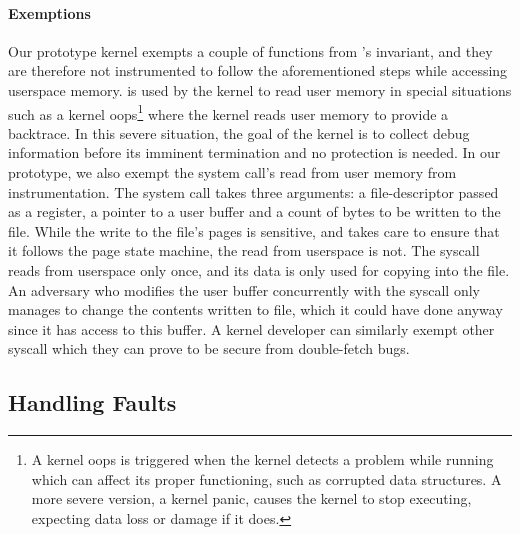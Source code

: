 \documentclass[letterpaper,twocolumn,10pt, anonymous]{article}
\begin{document}
\paragraph{Exemptions}
Our prototype \tiktok kernel exempts a couple of functions 
from \tiktok's invariant, and they are therefore not instrumented 
to follow the aforementioned steps while accessing userspace
memory. 
 is used by the kernel to 
read user memory in special situations such as a kernel 
oops\footnote{A kernel oops is triggered when the kernel detects a 
problem while running which can affect its proper functioning, such 
as corrupted data structures. 
A more severe version, a kernel panic, causes the kernel to stop 
executing, expecting data loss or damage if it does.}
where the kernel reads user memory to provide a backtrace. 
In this severe situation, the goal of the kernel is to collect debug 
information before its imminent termination and no \tocttou protection 
is needed.
In our prototype, we also exempt the  system 
call's read from user memory from instrumentation.
The  system call takes three arguments: a 
file-descriptor passed as a register, a pointer to a user 
buffer and a count of bytes to be written to the file.
While the write to the file's pages is sensitive, and 
\tiktok takes care to ensure that it follows the page state 
machine, the read from userspace is not. 
The syscall reads from userspace only once, and its data 
is only used for copying into the file.
An adversary who modifies the user buffer concurrently with 
the syscall only manages to change the contents written to 
file, which it could have done anyway since it has access to 
this buffer.
A kernel developer can similarly exempt other syscall which 
they can prove to be secure from double-fetch bugs.


\subsection{Handling Faults}
\end{document}
